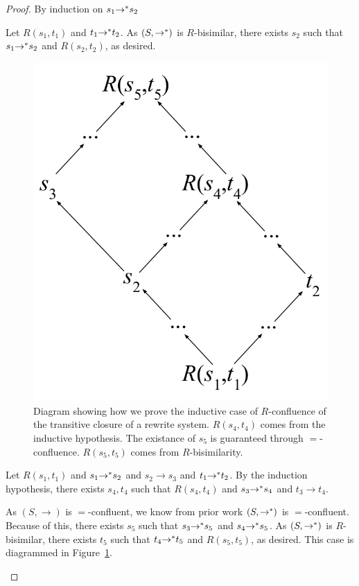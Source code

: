 \documentclass{easychair}
\begin{document}
\begin{proof}
  By induction on $s_1 {\rightarrow}^* s_2$
  \begin{case}
    Let $R(s_1,t_1)$ and $t_1 {\rightarrow}^* t_2$. As
    $(S,{\rightarrow}^*)$ is $R$-bisimilar, there exists $s_2$ such that
    $s_1 {\rightarrow}^* s_2$ and $R(s_2,t_2)$, as desired.
  \end{case}

  \begin{figure}
    \centering
    \includegraphics[scale=.4]{solved-proof.pdf}
    \caption{Diagram showing how we prove the inductive case of $R$-confluence
      of the transitive closure of a rewrite system. $R(s_4,t_4)$ comes from the
      inductive hypothesis. The existance of $s_5$ is guaranteed through
      $=$-confluence. $R(s_5,t_5)$ comes from $R$-bisimilarity.}
    \label{fig:solved-proof}
  \end{figure}
  
  \begin{case}
    Let $R(s_1,t_1)$ and $s_1 {\rightarrow}^* s_2$ and $s_2 \rightarrow
    s_3$ and $t_1 {\rightarrow}^* t_2$. By the induction hypothesis, there
    exists $s_4,t_4$ such that $R(s_4,t_4)$ and $s_3 {\rightarrow}^* s_4$
    and $t_3 \rightarrow t_4$.

    As $(S,\rightarrow)$ is $=$-confluent, we know from prior work
    $(S,{\rightarrow}^*)$ is $=$-confluent. Because of this, there exists
    $s_5$ such that $s_3 {\rightarrow}^* s_5$ and $s_4 {\rightarrow}^*
    s_5$. As $(S,{\rightarrow}^*)$ is $R$-bisimilar, there exists $t_5$
    such that $t_4 {\rightarrow}^* t_5$ and $R(s_5,t_5)$, as desired. This
    case is diagrammed in Figure~\ref{fig:solved-proof}.
  \end{case}
\end{proof}
\end{document}
